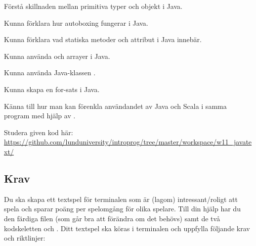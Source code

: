 
\Lab{\LabWeekELEVEN}

\begin{Goals}
\item Förstå skillnaden mellan primitiva typer och objekt i Java.
\item Kunna förklara hur autoboxing fungerar i Java.
\item Kunna förklara vad statiska metoder och attribut i Java innebär.
\item Kunna använda  och arrayer i Java.
\item Kunna använda Java-klassen .
\item Kunna skapa en for-sats i Java.
\item Känna till hur man kan förenkla användandet av Java och Scala i samma program med hjälp av .
\end{Goals}

\begin{Preparations}
\item {}
\item Studera given kod här: \url{https://github.com/lunduniversity/introprog/tree/master/workspace/w11_javatext/}
\end{Preparations}

\subsection{Krav}

Du ska skapa ett textspel för terminalen som är (lagom) intressant/roligt att spela och sparar poäng per spelomgång för olika spelare. Till din hjälp har du den färdiga filen  (som går bra att förändra om det behövs) samt de två kodskeletten  och . Ditt textspel ska köras i terminalen och uppfylla följande krav och riktlinjer:

